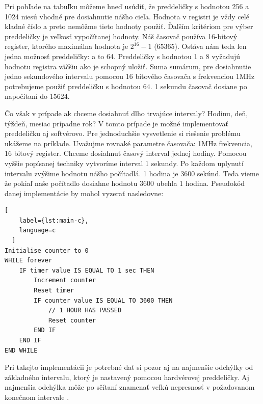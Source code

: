 Pri pohľade na tabuľku môžeme hneď usúdiť, že preddeličky s hodnotou 256 a 1024 niesú vhodné pre dosiahnutie nášho cieľa. Hodnota v registri je vždy celé kladné číslo a preto nemôžme tieto hodnoty použiť. Ďalším kritériom pre výber preddeličky je veľkosť
vypočítanej hodnoty. Náš časovač používa 16-bitový register, ktorého maximálna hodnota je $2^{16} -1$ (65365).
Ostáva nám teda len jedna možnosť preddeličky: a to 64. Preddeličky s hodnotou 1 a 8 vyžadujú hodnotu registra väčšiu ako je schopný uložiť.
Suma sumárum, pre dosiahnutie jedno sekundového intervalu pomocou 16 bitového časovača s frekvenciou 1MHz potrebujeme použiť preddeličku s hodnotou 64.
1 sekundu časovač dosiane po napočítaní do 15624. \par
Čo však v prípade ak chceme dosiahnuť dlho trvajúce intervaly? Hodinu, deň, týždeň, mesiac prípadne rok?
V tomto prípade je možné implementovať preddeličku aj softvérovo. Pre jednoduchšie vysvetlenie si riešenie problému ukážeme na príklade. Uvažujme rovnaké parametre časovača: 1MHz frekvencia, 16 bitový register. Chceme dosiahnuť časový interval jednej hodiny. Pomocou vyššie popísanej techniky vytvoríme interval 1 sekundy.
Po každom uplynutí intervalu zvýšime hodnotu nášho počítadlá. 1 hodina je 3600 sekúnd. Teda vieme že pokiaľ naše počítadlo dosiahne hodnotu 3600 ubehla 1 hodina.
Pseudokód danej implementácie by mohol vyzerať nasledovne:
\begin{lstlisting}[
    label={lst:main-c},
    language=c
  ]  
Initialise counter to 0
WHILE forever
    IF timer value IS EQUAL TO 1 sec THEN
        Increment counter
        Reset timer
        IF counter value IS EQUAL TO 3600 THEN
            // 1 HOUR HAS PASSED
            Reset counter
        END IF
    END IF
END WHILE
\end{lstlisting}
Pri takejto implementácii je potrebné dať si pozor aj na najmenšie odchýlky od základného intervalu, ktorý je nastavený pomocou hardvérovej preddeličky.
Aj najmenšia odchýlka môže po sčítaní znamenať veľkú nepresnosť v požadovanom konečnom intervale \cite{cameraNewbieGuideAVR2015}.

